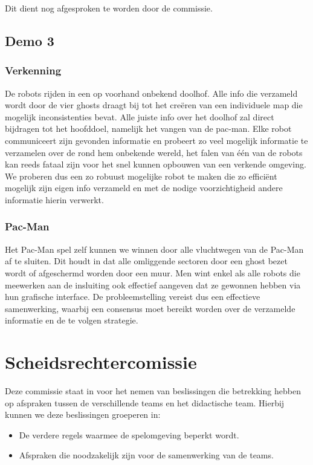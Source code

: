 \documentclass[12pt,a4paper]{report}
\begin{document}
Dit dient nog afgesproken te worden door de commissie.

\section{Demo 3}

\subsection{Verkenning}

De robots rijden in een op voorhand onbekend doolhof. Alle info die verzameld wordt door de vier ghosts draagt bij tot het cre\"eren van een individuele map die mogelijk inconsistenties bevat. Alle juiste info over het doolhof zal direct bijdragen tot het hoofddoel, namelijk het vangen van de pac-man. Elke robot communiceert zijn gevonden informatie en probeert zo veel mogelijk informatie te verzamelen over de rond hem onbekende wereld, het falen van \'e\'en van de robots kan reeds fataal zijn voor het snel kunnen opbouwen van een verkende omgeving. We proberen dus een zo robuust mogelijke robot te maken die zo effici\"ent mogelijk zijn eigen info verzameld en met de nodige voorzichtigheid andere informatie hierin verwerkt.

\subsection{Pac-Man}

Het Pac-Man spel zelf kunnen we winnen door alle vluchtwegen van de Pac-Man af te sluiten. Dit houdt in dat alle omliggende sectoren door een ghost bezet wordt of afgeschermd worden door een muur. Men wint enkel als alle robots die meewerken aan de insluiting ook effectief aangeven dat ze gewonnen hebben via hun grafische interface. De probleemstelling vereist dus een effectieve samenwerking, waarbij een consensus moet bereikt worden over de verzamelde informatie en de te volgen strategie.

\chapter{Scheidsrechtercomissie}

Deze commissie staat in voor het nemen van beslissingen die betrekking hebben op afspraken tussen de verschillende teams en het didactische team. Hierbij kunnen we deze beslissingen groeperen in:
\begin{itemize}
	\item De verdere regels waarmee de spelomgeving beperkt wordt.
	\item Afspraken die noodzakelijk zijn voor de samenwerking van de teams.
\end{itemize}
\end{document}
